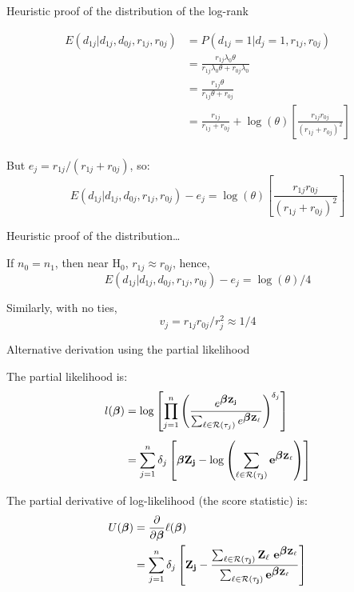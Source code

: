 \documentclass[ignorenonframetext,]{beamer}
\newcommand{\bbeta}{\mbox{\boldmath$\beta$}}
\newcommand{\bZ}{\bf Z}
\begin{document}
\begin{frame}{%
\protect\hypertarget{heuristic-proof-of-the-distribution-of-the-log-rank}{%
Heuristic proof of the distribution of the log-rank}}

\begin{align*} 
 E(d_{1j} | d_{1j}, d_{0j}, r_{1j}, r_{0j}) 
    &= P( d_{1j} = 1 | d_{j}=1, r_{1j}, r_{0j}) \\[1ex]
    &=  \frac  {r_{1j} \lambda_0 \theta}
    {r_{1j} \lambda_0 \theta + r_{0j} \lambda_0}\\[1ex]
     &=  \frac  {r_{1j}  \theta} {r_{1j}  
\theta + r_{0j} }\\[1ex]
     &=  \frac  {r_{1j}} {r_{1j} + r_{0j} } + \log(\theta) 
      \left[\frac  {r_{1j}r_{0j}} {(r_{1j} + r_{0j})^2}\right]  \\
\end{align*}

But \(e_j = r_{1j}/(r_{1j} + r_{0j})\), so:
\[    E(d_{1j} | d_{1j}, d_{0j}, r_{1j}, r_{0j}) - e_j =
 \log(\theta) \left[\frac  {r_{1j}r_{0j}} {(r_{1j} + r_{0j})^2 }\right] \]

\end{frame}

\begin{frame}{%
\protect\hypertarget{heuristic-proof-of-the-distribution}{%
Heuristic proof of the distribution\ldots}}

If \(n_0=n_1\), then near H\(_0\), \(r_{1j} \approx r_{0j}\), hence,
\[    E(d_{1j} | d_{1j}, d_{0j}, r_{1j}, r_{0j}) - e_j = \log(\theta) /4 \]

Similarly, with no ties, \[ v_j = r_{1j} r_{0j}/r_j^2 \approx 1/4 \]

\end{frame}

\begin{frame}{%
\protect\hypertarget{alternative-derivation-using-the-partial-likelihood}{%
Alternative derivation using the partial likelihood}}

\small

The partial likelihood is: \begin{align*}
  l(\bbeta)   &=  \log \left[ \prod_{j=1}^{n}\left(    \frac
      {   e^{\bbeta \bZ_j } }   {\sum_{\ell \in {\cal R}(\tau_j)}
e^{\bbeta \bZ_{\ell}} }\right)^{\delta_j} \right]  \\[1ex]
&=\sum_{j=1}^{n} \delta_j  \left[ \bbeta \bZ_j  -
\log \left(\sum_{\ell \in {\cal R}(\tau_j)} e^{\bbeta \bZ_{\ell}}\right) 
\right]
\end{align*}

The partial derivative of log-likelihood (the score statistic) is:
\begin{align*}
U(\bbeta)   &=  \frac{\partial}{\partial \bbeta} \ell(\bbeta) \\
&=  \sum_{j=1}^{n} \delta_j  \left[ \bZ_j  -
\frac{ \sum_{\ell \in {\cal R}(\tau_j)} \bZ_{\ell} ~e^{\bbeta \bZ_{\ell}} }
{ \sum_{\ell \in {\cal R}(\tau_j)}   e^{\bbeta  \bZ_{\ell}} } \right]
\end{align*}

\end{frame}
\end{document}
